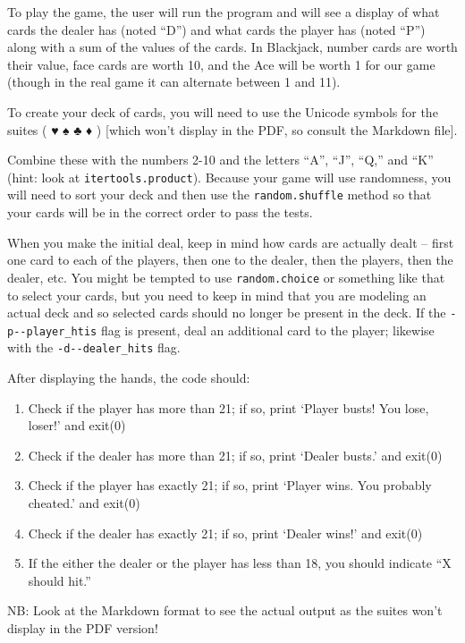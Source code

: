 \documentclass[]{article}
\providecommand{\tightlist}{%
  \setlength{\itemsep}{0pt}\setlength{\parskip}{0pt}}
\begin{document}
To play the game, the user will run the program and will see a display
of what cards the dealer has (noted ``D'') and what cards the player has
(noted ``P'') along with a sum of the values of the cards. In Blackjack,
number cards are worth their value, face cards are worth 10, and the Ace
will be worth 1 for our game (though in the real game it can alternate
between 1 and 11).

To create your deck of cards, you will need to use the Unicode symbols
for the suites ( ♥ ♠ ♣ ♦ ) {[}which won't display in the PDF, so consult
the Markdown file{]}.

Combine these with the numbers 2-10 and the letters ``A'', ``J'', ``Q,''
and ``K'' (hint: look at \texttt{itertools.product}). Because your game
will use randomness, you will need to sort your deck and then use the
\texttt{random.shuffle} method so that your cards will be in the correct
order to pass the tests.

When you make the initial deal, keep in mind how cards are actually
dealt -- first one card to each of the players, then one to the dealer,
then the players, then the dealer, etc. You might be tempted to use
\texttt{random.choice} or something like that to select your cards, but
you need to keep in mind that you are modeling an actual deck and so
selected cards should no longer be present in the deck. If the
\texttt{-p\textbar{}-\/-player\_htis} flag is present, deal an
additional card to the player; likewise with the
\texttt{-d\textbar{}-\/-dealer\_hits} flag.

After displaying the hands, the code should:

\begin{enumerate}
\def\labelenumi{\arabic{enumi}.}
\tightlist
\item
  Check if the player has more than 21; if so, print `Player busts! You
  lose, loser!' and exit(0)
\item
  Check if the dealer has more than 21; if so, print `Dealer busts.' and
  exit(0)
\item
  Check if the player has exactly 21; if so, print `Player wins. You
  probably cheated.' and exit(0)
\item
  Check if the dealer has exactly 21; if so, print `Dealer wins!' and
  exit(0)
\item
  If the either the dealer or the player has less than 18, you should
  indicate ``X should hit.''
\end{enumerate}

NB: Look at the Markdown format to see the actual output as the suites
won't display in the PDF version!
\end{document}
